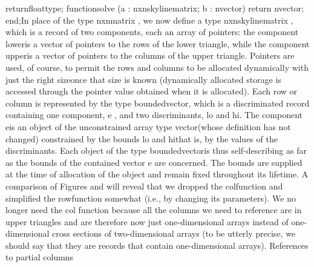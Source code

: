 \tyxtstxbf[]return\tyxtstxendbf[] float\Symuns[]type;
   \tyxtstxbf[]function\tyxtstxendbf[] solve (a : nxn\Symuns[]skyline\Symuns[]matrix;
                   b : n\Symuns[]vector) \tyxtstxbf[]return%
\tyxtstxendbf[] n\Symuns[]vector;
\tyxtstxbf[]end\tyxtstxendbf[];\Endcomp[]
\EndParbox[]
\FgEndblock[]
 In place of the type \tyxffmxmono[]nxn\Symuns[]matrix%
\tyxffmxendmono[], we now define a type \tyxffmxmono[]nxn\Symuns[]skyline\Symuns[]matrix%
\tyxffmxendmono[], which is a record of two components, each an array
of pointers: the component \tyxffmxmono[]lower\tyxffmxendmono[] is
a vector of pointers to the rows of the lower triangle, while the
component \tyxffmxmono[]upper\tyxffmxendmono[] is a vector of pointers
to the columns of the upper triangle. Pointers are used, of course,
to permit the rows and columns to be allocated dynamically with just
the right \ldquo[]size\rdquo[] once that size is known (dynamically
allocated storage is accessed through the pointer value obtained when
it is allocated). Each row or column is represented by the type %
\tyxffmxmono[]bounded\Symuns[]vector\tyxffmxendmono[], which is a
discriminated record containing one component, \tyxffmxmono[]e%
\tyxffmxendmono[], and two discriminants, \tyxffmxmono[]lo%
\tyxffmxendmono[] and \tyxffmxmono[]hi\tyxffmxendmono[]. The component
\tyxffmxmono[]e\tyxffmxendmono[] is an object of the unconstrained
array type \tyxffmxmono[]vector\tyxffmxendmono[] (whose definition
has not changed) constrained by the bounds \tyxffmxmono[]lo%
\tyxffmxendmono[] and \tyxffmxmono[]hi\tyxffmxendmono[]\EmDash[]that
is, by the values of the discriminants. Each object of the type %
\tyxffmxmono[]bounded\Symuns[]vector\tyxffmxendmono[] is thus self-describing
as far as the bounds of the contained vector \tyxffmxmono[]e%
\tyxffmxendmono[] are concerned. The bounds are supplied at the time
of allocation of the object and remain fixed throughout its lifetime.%
\Endpara[]
\Para[]A comparison of Figures 
and  will reveal that we dropped
the \tyxffmxmono[]col\tyxffmxendmono[] function and simplified the
\tyxffmxmono[]row\tyxffmxendmono[] function somewhat (i.e., by changing
its parameters). We no longer need the \tyxffmxmono[]col%
\tyxffmxendmono[] function because all the columns we need to reference
are in upper triangles and are therefore now just one-dimensional
arrays instead of one-dimensional cross sections of two-dimensional
arrays (to be utterly precise, we should say that they are records
that contain one-dimensional arrays). References to partial columns

